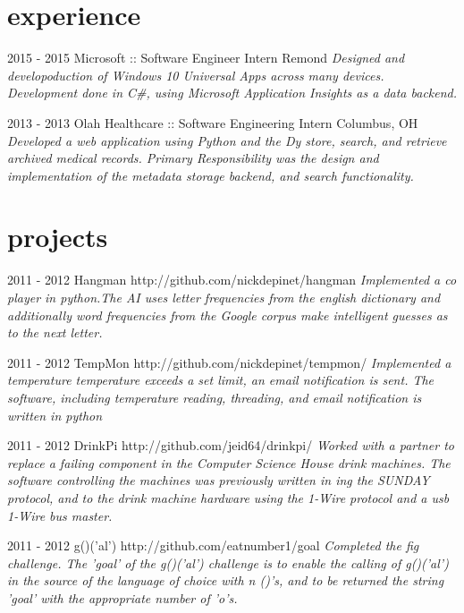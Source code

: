\documentclass[]{friggeri-cv}
\begin{document}
\section{experience}

\begin{entrylist}

  \entry
    { 2015 - 2015 }
    { Microsoft :: Software Engineer Intern }
    { Remond }
    {\emph{ Designed and developoduction of Windows 10 Universal Apps across many devices. Development done in C#, using Microsoft Application Insights as a data backend. }}

  \entry
    { 2013 - 2013 }
    { Olah Healthcare :: Software Engineering Intern  }
    { Columbus, OH }
    {\emph{ Developed a web application using Python and the Dy store, search, and retrieve archived medical records. Primary Responsibility was the design and implementation of the metadata storage backend, and search functionality. }}


\end{entrylist}

\section{projects}

\begin{entrylist}
  
  \entry
    { 2011 - 2012 }
    { Hangman }
    { http://github.com/nickdepinet/hangman }
    {\emph{ Implemented a co player in python.The AI uses letter frequencies from the english dictionary and additionally word frequencies from the Google corpus make intelligent guesses as to the next letter. }}

  \entry
    { 2011 - 2012 }
    { TempMon }
    { http://github.com/nickdepinet/tempmon/ }
    {\emph{ Implemented a temperature  temperature exceeds a set limit, an email notification is sent. The software, including temperature reading, threading, and email notification is written in python }}

  \entry
    { 2011 - 2012 }
    { DrinkPi }
    { http://github.com/jeid64/drinkpi/ }
    {\emph{ Worked with a partner to replace a failing component in the Computer Science House drink machines. The software controlling the machines was previously written in ing the SUNDAY protocol, and to the drink machine hardware using the 1-Wire protocol and a usb 1-Wire bus master. }}

  \entry
    { 2011 - 2012 }
    { g()('al') }
    { http://github.com/eatnumber1/goal }
    {\emph{ Completed the fig challenge. The 'goal' of the g()('al') challenge is to enable the calling of g()('al') in the source of the language of choice with n ()'s, and to be returned the string 'goal' with the appropriate number of 'o's. }}

\end{entrylist}
\end{document}
